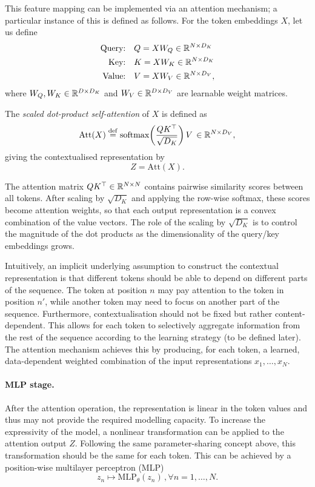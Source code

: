 This feature mapping can be implemented via an attention mechanism; a particular instance of this is defined as follows. For the token embeddings $X$, let us define
\[
\begin{aligned}
\text{Query:} \quad & Q = XW_Q \in {\mathbb R}^{N\times D_K}\\
\text{Key:}   \quad & K = XW_K \in {\mathbb R}^{N\times D_K}\\
\text{Value:} \quad & V = XW_V \in {\mathbb R}^{N\times D_V},
\end{aligned}
\]
where $W_Q, W_K \in {\mathbb R}^{D \times D_K}$
and $W_V \in {\mathbb R}^{D \times D_V}$ are learnable weight matrices.

The \emph{scaled dot-product self-attention} of $X$ is defined as
\[
\mathrm{Att}(X)
\mathrel{\stackrel{\mathrm{def}}{=}}
\mathrm{softmax}\!\left(
\frac{QK^\top}{\sqrt{D_K}}
\right)V\, \in {\mathbb R}^{N\times D_V},
\]
giving the contextualised representation by 
\[
Z = \mathrm{Att}(X).\]

The attention matrix $QK^\top \in {\mathbb R}^{N \times N}$ contains pairwise similarity scores between all tokens.
After scaling by $\sqrt{D_K}$ and applying the row-wise softmax, these scores become attention weights, so that each output representation is a convex combination of the value vectors. The role of the scaling by $\sqrt{D_K}$ is to control the magnitude of the dot products as the dimensionality of the query/key embeddings grows.

Intuitively, an implicit underlying assumption to construct the contextual representation is that different tokens should be able to depend on different parts of the sequence. The token at position $n$ may pay attention to the token in position $n'$, while another token may need to focus on another part of the sequence. Furthermore, contextualisation should not be fixed but rather content-dependent. This allows for each token to selectively aggregate information from the rest of the sequence according to the learning strategy (to be defined later). The attention mechanism achieves this by producing, for each token, a learned, data-dependent weighted combination of
the input representations $x_1, \dots, x_N$.

\paragraph{MLP stage.}
After the attention operation, the representation is linear in the token values and thus may not provide the required modelling capacity.  To increase the expressivity of the model, a nonlinear transformation can be applied to the attention output $Z$. Following the same parameter-sharing concept above, this transformation should be the same for each token. This can be achieved by a position-wise multilayer perceptron (MLP)
\begin{equation}
    z_n \mapsto \text{MLP}_\theta(z_n)\,, \forall n=1,\ldots,N.
\end{equation}

